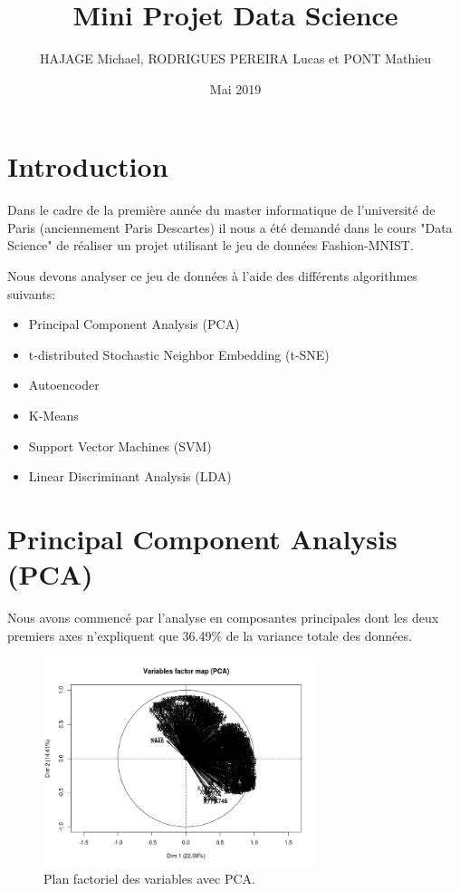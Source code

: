 \documentclass{article}
\title{Mini Projet Data Science}
\author{HAJAGE Michael, RODRIGUES PEREIRA Lucas et PONT Mathieu}
\date{Mai 2019}
\begin{document}
\maketitle

\section{Introduction}
Dans le cadre de la première année du master informatique de l'université de Paris (anciennement Paris Descartes) il nous a été demandé dans le cours "Data Science" de réaliser un projet utilisant le jeu de données Fashion-MNIST. 

Nous devons analyser ce jeu de données à l'aide des différents algorithmes suivants:

\begin{itemize}
\item Principal Component Analysis (PCA)
\item t-distributed Stochastic Neighbor Embedding (t-SNE)
\item Autoencoder
\item K-Means
\item Support Vector Machines (SVM)
\item Linear Discriminant Analysis (LDA)
\end{itemize}

\section{Principal Component Analysis (PCA)}

Nous avons commencé par l'analyse en composantes principales dont les deux premiers axes n'expliquent que 36.49\% de la variance totale des données.

\begin{figure}[H] 
\centering
\includegraphics[width=300]{pca_var_factor_map.png}
\caption{Plan factoriel des variables avec PCA.}
\label{fig:pca_var}
\end{figure}
\end{document}
